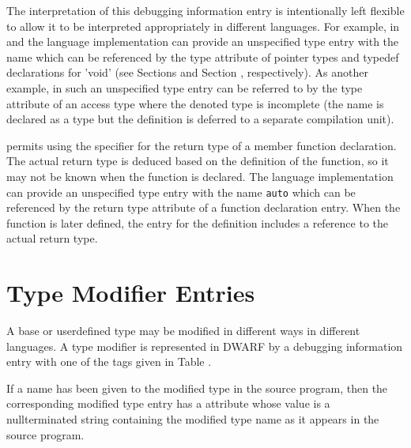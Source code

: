 The interpretation of this debugging information entry is
intentionally left flexible to allow it to be interpreted
appropriately in different languages. For example, in 
 and 
the language implementation can provide an unspecified type
entry with the name  which can be referenced by the
type attribute of pointer types and typedef declarations for
'void' (see 
Sections  and 
Section , 
respectively). As another
example, in  such an unspecified type entry can be referred
to by the type attribute of an access type where the denoted
type is incomplete (the name is declared as a type but the
definition is deferred to a separate compilation unit).

 permits using the 
 specifier for the return 
type of a member function declaration. 
The actual return type is deduced based on the definition of the 
function, so it may not be known when the function is declared.  The language 
implementation can provide an unspecified type entry with the name \texttt{auto} which 
can be referenced by the return type attribute of a function declaration entry.  
When the function is later defined, the \DWTAGsubprogram{} entry for the definition
includes a reference to the actual return type.


\section{Type Modifier Entries}
\label{chap:typemodifierentries}
A base or user\dash defined type may be modified in different ways
in different languages. A type modifier is represented in
DWARF by a debugging information entry with one of the tags
given in Table .

If a name has been given to the modified type in the source
program, then the corresponding modified type entry has
a \DWATname{} attribute 
whose value is a null\dash terminated
string containing the modified type name as it appears in
the source program.

